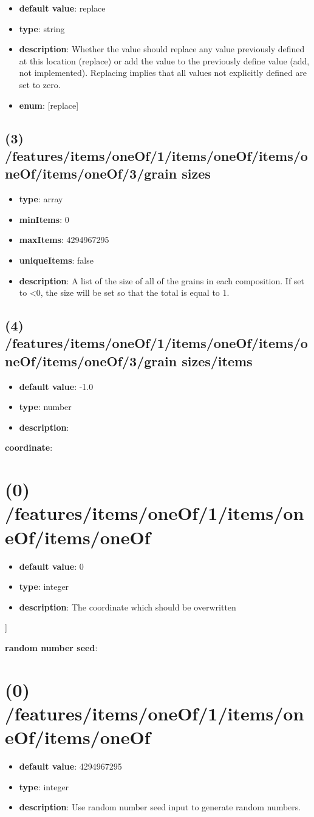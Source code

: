\begin{itemize}[leftmargin=3em]\item {\bf default value}: replace
\item {\bf type}: string
\item {\bf description}: Whether the value should replace any value previously defined at this location (replace) or add the value to the previously define value (add, not implemented). Replacing implies that all values not explicitly defined are set to zero.
\item {\bf enum}: [replace]\end{itemize}\subsection{(3) /features/items/oneOf/1/items/oneOf/items/oneOf/items/oneOf/3/grain sizes}
\begin{itemize}[leftmargin=3em]\item {\bf type}: array
\item {\bf minItems}: 0
\item {\bf maxItems}: 4294967295
\item {\bf uniqueItems}: false
\item {\bf description}: A list of the size of all of the grains in each composition. If set to <0, the size will be set so that the total is equal to 1.
\end{itemize}\subsection{(4) /features/items/oneOf/1/items/oneOf/items/oneOf/items/oneOf/3/grain sizes/items}
\begin{itemize}[leftmargin=4em]\item {\bf default value}: -1.0
\item {\bf type}: number
\item {\bf description}: 
\end{itemize}\item {\bf coordinate}: \section{(0) /features/items/oneOf/1/items/oneOf/items/oneOf}
\begin{itemize}[leftmargin=0em]\item {\bf default value}: 0
\item {\bf type}: integer
\item {\bf description}: The coordinate which should be overwritten
\end{itemize}]\item {\bf random number seed}: \section{(0) /features/items/oneOf/1/items/oneOf/items/oneOf}
\begin{itemize}[leftmargin=0em]\item {\bf default value}: 4294967295
\item {\bf type}: integer
\item {\bf description}: Use random number seed input to generate random numbers.
\end{itemize}